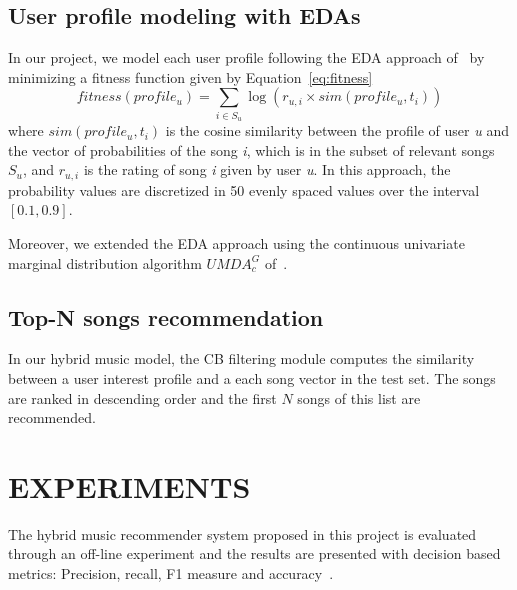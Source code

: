 \documentclass{article}
\begin{document}


\subsection{User profile modeling with EDAs}

In our project, we model each user profile following the EDA approach of~\cite{Liang2014781} by minimizing a fitness function given by Equation~\eqref{eq:fitness}
\
\begin{equation}
fitness(profile_u) =\sum_{i\in S_u}\log(r_{u,i}\times sim(profile_u,t_i))
\label{eq:fitness}
\end{equation}
where \emph{$sim(profile_u,t_i)$} is the cosine similarity between the profile of user \emph{u} and the vector of probabilities of the song \emph{i}, which is in the subset of relevant songs \emph{$S_u$}, and \emph{$r_{u,i}$} is the rating of song \emph{i} given by user \emph{u}. In this approach, the probability values are discretized in 50 evenly spaced values over the interval $[0.1, 0.9]$.

Moreover, we extended the EDA approach using the continuous univariate marginal distribution algorithm $UMDA_c^G$ of~\cite{gallagher2007bayesian}.

\subsection{Top-N songs recommendation}

In our hybrid music model, the CB filtering module computes the similarity between a user interest profile and a each song vector in the test set. The songs are ranked in descending order and the first $N$ songs of this list are recommended.

\section{EXPERIMENTS}
\label{sec:pagestyle}
The hybrid music recommender system proposed in this project is evaluated through an off-line experiment and the results are presented with decision based metrics: Precision, recall, F1 measure and accuracy~\cite{1242}.
\end{document}
